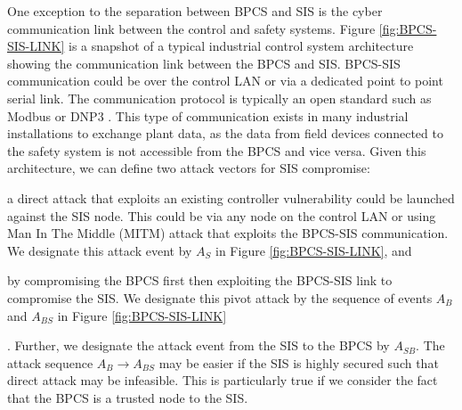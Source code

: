 \documentclass[journal]{IEEEtran}
\begin{document}
One exception to the separation between BPCS and SIS is the cyber communication link between the control and safety systems. Figure \ref{fig:BPCS-SIS-LINK} is a snapshot of a typical industrial control system architecture showing the communication link between the BPCS and SIS. BPCS-SIS communication could be over the control LAN or via a dedicated point to point serial link. The communication protocol is typically an open standard such as Modbus or DNP3 \cite{swales1999open,Fovino2010}. This type of communication exists in many industrial installations to exchange plant data, as the data from field devices connected to the safety system is not accessible from the BPCS and vice versa. Given this architecture, we can define two attack vectors for SIS compromise: \begin{inparaenum}[(1)] \item a direct attack that exploits an existing controller vulnerability could be launched against the SIS node. This could be via any node on the control LAN or using Man In The Middle (MITM) attack that exploits the BPCS-SIS communication. We designate this attack event by $A_S$ in Figure \ref{fig:BPCS-SIS-LINK}, and \item by compromising the BPCS first then exploiting the BPCS-SIS link to compromise the SIS. We designate this pivot attack by the sequence of events $A_B$ and $A_{BS}$ in Figure \ref{fig:BPCS-SIS-LINK}\end{inparaenum}. Further, we designate the attack event from the SIS to the BPCS by $A_{SB}$. The attack sequence $A_B \rightarrow A_{BS}$ may be easier if the SIS is highly secured such that direct attack may be infeasible. This is particularly true if we consider the fact that the BPCS is a trusted node to the SIS.
\end{document}

